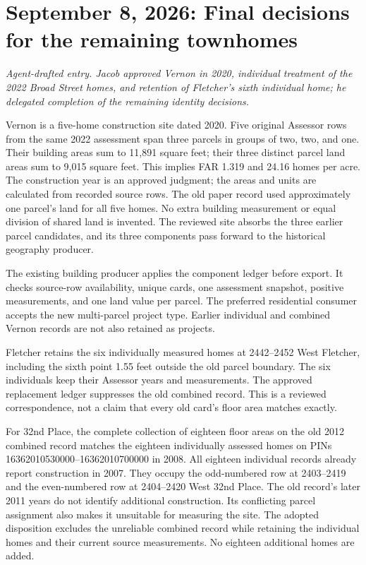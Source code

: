 \section*{September 8, 2026: Final decisions for the remaining townhomes}
\textit{Agent-drafted entry. Jacob approved Vernon in 2020, individual treatment of the 2022 Broad Street homes, and retention of Fletcher's sixth individual home; he delegated completion of the remaining identity decisions.}

Vernon is a five-home construction site dated 2020. Five original Assessor rows
from the same 2022 assessment span three parcels in groups of two, two, and one.
Their building areas sum to 11,891 square feet; their three distinct parcel land
areas sum to 9,015 square feet. This implies FAR 1.319 and 24.16 homes per acre.
The construction year is an approved judgment; the areas and units are calculated
from recorded source rows. The old paper record used approximately one parcel's
land for all five homes. No extra building measurement or equal division of shared
land is invented. The reviewed site absorbs the three earlier parcel candidates,
and its three components pass forward to the historical geography producer.

The existing building producer applies the component ledger before export. It
checks source-row availability, unique cards, one assessment snapshot, positive
measurements, and one land value per parcel. The preferred residential consumer
accepts the new multi-parcel project type. Earlier individual and combined Vernon
records are not also retained as projects.

Fletcher retains the six individually measured homes at 2442--2452 West Fletcher,
including the sixth point 1.55 feet outside the old parcel boundary. The six
individuals keep their Assessor years and measurements. The approved replacement
ledger suppresses the old combined record. This is a reviewed correspondence,
not a claim that every old card's floor area matches exactly.

For 32nd Place, the complete collection of eighteen floor areas on the old
2012 combined record matches the eighteen individually assessed homes on PINs
16362010530000--16362010700000 in 2008. All eighteen individual records already
report construction in 2007. They occupy the odd-numbered row at 2403--2419 and
the even-numbered row at 2404--2420 West 32nd Place. The old record's later 2011
years do not identify additional construction. Its conflicting parcel assignment
also makes it unsuitable for measuring the site. The adopted disposition excludes
the unreliable combined record while retaining the individual homes and their
current source measurements. No eighteen additional homes are added.

